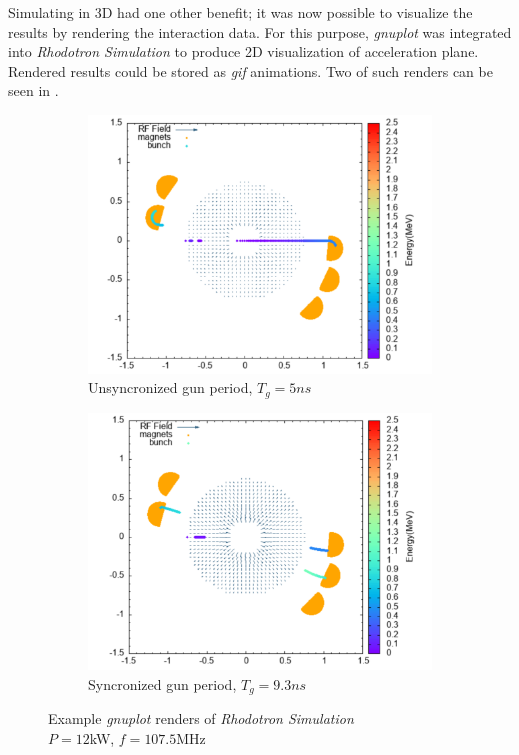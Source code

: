 \documentclass[a4paper,oneside,12pt]{report}
\numberwithin{equation}{chapter}
\begin{document}
Simulating in 3D had one other benefit; it was now possible to visualize the results by rendering the interaction data. 
For this purpose, \textit{gnuplot} was integrated into \textit{Rhodotron Simulation} to produce 2D visualization of acceleration plane. 
Rendered results could be stored as \textit{gif} animations. 
Two of such renders can be seen in .
\begin{figure}[H]
    \captionsetup[subfigure]{justification=centering}
    \captionsetup{justification=centering}
    \centering
    \begin{subfigure}{0.9\textwidth}
        \centering
        \includegraphics[width=\linewidth]{./figures/rhodoSim/5ns_gnuplot.png}
        \caption*{Unsyncronized \e gun period, $T_g = 5ns$}
    \end{subfigure}
    \begin{subfigure}{0.9\textwidth}
        \centering
        \includegraphics[width=\linewidth]{./figures/rhodoSim/9_3ns_gnuplot.png}
        \caption*{Syncronized \e gun period, $T_g = 9.3ns$}
    \end{subfigure}
    \caption{Example \textit{gnuplot} renders of \textit{Rhodotron Simulation}\\$P=12$kW, $f=107.5$MHz}
    \label{fig:example_gnuplot_renders}
\end{figure}
\end{document}
